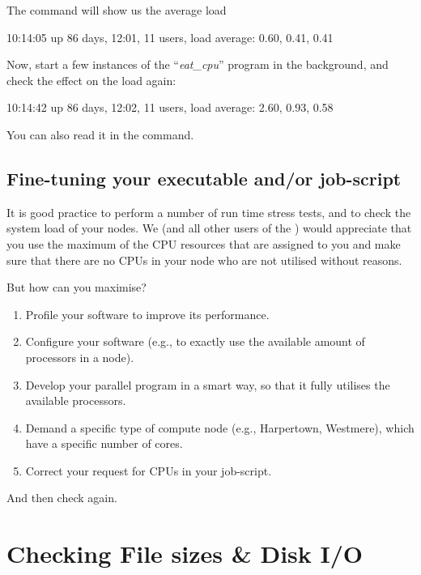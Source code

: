 The  command will show us the average load
\begin{prompt}
10:14:05 up 86 days, 12:01, 11 users, load average: 0.60, 0.41, 0.41
\end{prompt}

Now, start a few instances of the ``\emph{eat\_cpu}'' program in the
background, and check the effect on the load again:

\begin{prompt}
10:14:42 up 86 days, 12:02, 11 users, load average: 2.60, 0.93, 0.58
\end{prompt}

You can also read it in the  command.
\subsection{Fine-tuning your executable and/or job-script}

It is good practice to perform a number of run time stress tests, and to check
the system load of your nodes. We (and all other users of the \hpc) would
appreciate that you use the maximum of the CPU resources that are assigned to
you and make sure that there are no CPUs in your node who are not utilised
without reasons.

But how can you maximise?

\begin{enumerate}
\item  Profile your software to improve its performance.
\item  Configure your software (e.g., to exactly use the available amount of processors in a node).
\item  Develop your parallel program in a smart way, so that it fully utilises the available processors.
\item  Demand a specific type of compute node (e.g., Harpertown, Westmere), which have a specific number of cores.
\item  Correct your request for CPUs in your job-script.
\end{enumerate}

And then check again.

\section{Checking File sizes \& Disk I/O}

